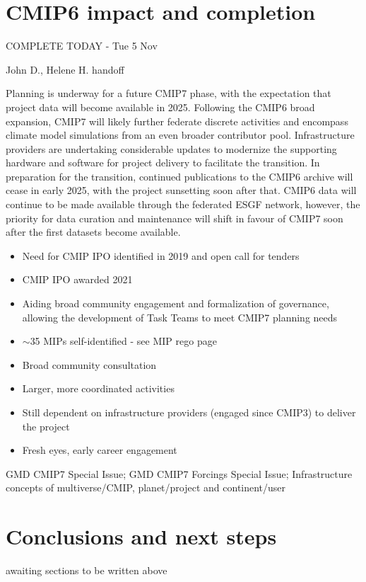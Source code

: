 \documentclass[gmd, preprint]{copernicus}
\def\cred#1{{\color{red}#1}}
\def\cblue#1{{\color{blue}#1}}
\begin{document}
\section{CMIP6 impact and completion}
\label{sec:CMIP6Completion}
\cblue{COMPLETE TODAY - Tue 5 Nov}

\cred{John D., Helene H. handoff}

Planning is underway for a future CMIP7 phase, with the expectation that project data will become available in 2025. Following the CMIP6 broad expansion, CMIP7 will likely further federate discrete activities and encompass climate model simulations from an even broader contributor pool. Infrastructure providers are undertaking considerable updates to modernize the supporting hardware and software for project delivery to facilitate the transition. In preparation for the transition, continued publications to the CMIP6 archive will cease in early 2025, with the project sunsetting soon after that. CMIP6 data will continue to be made available through the federated ESGF network, however, the priority for data curation and maintenance will shift in favour of CMIP7 soon after the first datasets become available.

\cred{
\begin{itemize}
	\item Need for CMIP IPO identified in 2019 and open call for tenders
	\item CMIP IPO awarded 2021
	\item Aiding broad community engagement and formalization of governance, allowing the development of Task Teams to meet CMIP7 planning needs
	\item $\sim$35 MIPs self-identified - see MIP rego page
	\item Broad community consultation
	\item Larger, more coordinated activities
	\item Still dependent on infrastructure providers (engaged since CMIP3) to deliver the project
    \item Fresh eyes, early career engagement
\end{itemize}
}

\cred{GMD CMIP7 Special Issue; GMD CMIP7 Forcings Special Issue; Infrastructure concepts of multiverse/CMIP, planet/project and continent/user}



\section{Conclusions and next steps} %
\label{sec:Conclusions}
\cred{awaiting sections to be written above}
\end{document}
